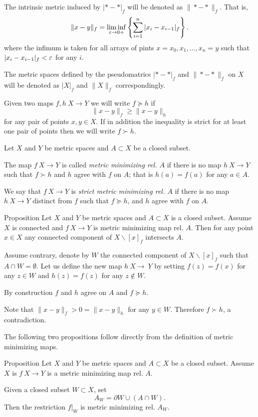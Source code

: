 \documentclass[a4paper,10pt]{amsart}
\begin{document}
The intrinsic metric induced by $|{*}-{*}|_f$ will be denoted as 
$\|{*}-{*}\|_f$. 
That is, 
\[\|x-y\|_f=\liminf_{\varepsilon\to0+}\left\{\sum_{i=1}^n|x_i-x_{i-1}|_f\right\}.\]
where the infimum is taken for all arrays of pints 
$x=x_0,x_1,\dots,x_n=y$ such that 
$|x_i-x_{i-1}|_f<\varepsilon$ for any $i$.

The metric spaces defined by the pseudomatrics $|{*}-{*}|_f$ 
and $\|{*}-{*}\|_f$ on $X$ will be denoted as $|X|_f$ and $\|X\|_f$ correspondingly.

Given two maps $f,h\:X\to Y$ we will write $f\succcurlyeq h$ if 
\[\|x-y\|_f\ge \|x-y\|_h\]
for any pair of points $x,y\in X$.
If in addition the inequality is strict for at least one pair of points then we will write $f\succ h$.

Let $X$ and $Y$ be metric spaces and $A\subset X$ be a closed subset.

The map $f\:X\to Y$ is called \emph{metric minimizing rel. $A$}
if there is no map $h\:X\to Y$ such that $f\succ h$
and $h$ agree with $f$ on $A$;
that is $h(a)=f(a)$ for any $a\in A$.

We say that $f\:X\to Y$ is \emph{strict metric minimizing rel. $A$}
if there is no map $h\:X\to Y$ distinct from $f$
such that $f\succcurlyeq h$, 
and $h$ agree with $f$ on $A$.

\begin{thm}{Proposition}\label{prop:point-complement}
Let $X$ and $Y$ be  metric spaces 
and $A\subset X$ is a closed subset.
Assume $X$ is connected and $f\:X\to Y$ is metric minimizing map rel. $A$.
Then for any point $x\in X$ any connected component of $X\backslash [x]_f$ intersects $A$.

\end{thm}

Assume contrary, denote by $W$ the connected component of $X\backslash [x]_f$ such that $A\cap W=\emptyset$.
Let us define the new map $h\:X\to\ Y$ 
by setting $f(z)=f(x)$ for any $z\in W$
and $h(z)=f(z)$ for any $z\notin W$.

By construction $f$ and $h$ agree on $A$ and $f\succcurlyeq h$.

Note that $\|x-y\|_f>0=\|x-y\|_h$ for any $y\in W$.
Therefore $f\succ h$, a contradiction.
\qeds

The following two propositions follow directly from the definition of metric minimizing maps.

\begin{thm}{Proposition}\label{prop:subset}
Let $X$ and $Y$ be metric spaces and $A\subset X$ be a closed subset.
Assume $X$ is $f\:X\to Y$ is a metric minimizing map rel. $A$.

Given a closed subset $W\subset X$, set 
\[A_W=\partial W\cup (A\cap W).\]
Then the restriction $f|_W$ is metric minimizing rel. $A_W$.
\end{thm}
\end{document}
